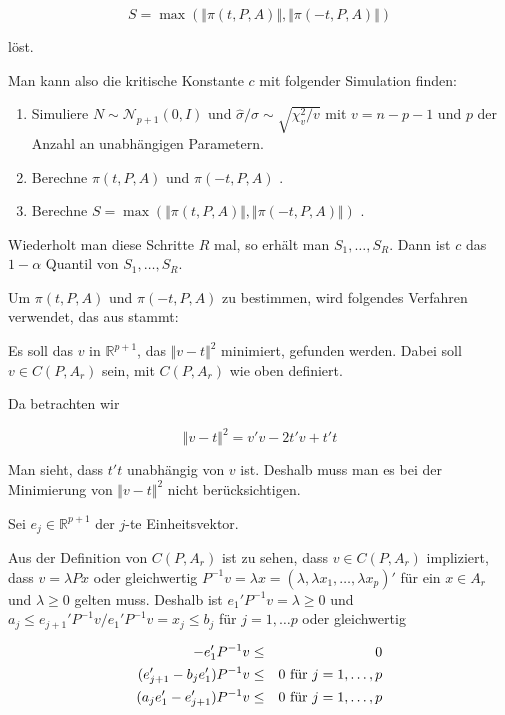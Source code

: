 \documentclass[12pt,a4paper]{article}
\theoremstyle{definition}
\theoremstyle{definition}
\theoremstyle{definition}
\theoremstyle{definition}
\begin{document}
\begin{equation*}
S=\max(\Vert \pi(t,P,A) \Vert, \Vert \pi(-t,P,A) \Vert)
\end{equation*}
 
löst. 

Man kann also die kritische Konstante $c$ mit folgender Simulation finden:

\begin{enumerate}
\item Simuliere $N \sim \mathscr{N}_{p+1}(0,I)$ und $\hat{\sigma}/\sigma\sim\sqrt{\chi_v^2/v}$ mit $v=n-p-1$ und $p$ der Anzahl an unabhängigen Parametern.
\item Berechne $\pi(t,P,A)$ und $\pi(-t,P,A)$ .
\item Berechne $S=\max(\Vert \pi(t,P,A) \Vert, \Vert \pi(-t,P,A) \Vert)$ .
\end{enumerate}

Wiederholt man diese Schritte $R$ mal, so erhält man $S_1, \ldots, S_R$. Dann ist $c$ das $1-\alpha$ Quantil von $S_1, \ldots, S_R$.

Um $\pi(t,P,A)$ und $\pi(-t,P,A)$ zu bestimmen, wird folgendes Verfahren verwendet, das aus \cite[Appendix B]{Liu64} stammt:

Es soll das $v$ in $\mathbb{R}^{p+1}$, das $\Vert v-t \Vert^2$ minimiert, gefunden werden. Dabei soll $v \in C(P,A_{r})$ sein, mit $C(P,A_{r})$ wie oben definiert. 

Da betrachten wir

\begin{equation*}
\Vert v-t \Vert^2 = v'v-2t'v+t't 
\end{equation*}

Man sieht, dass $t't$ unabhängig von $v$ ist. Deshalb muss man es bei der Minimierung von $\Vert v-t \Vert^2$ nicht berücksichtigen.
 
Sei $e_j \in \mathbb{R}^{p+1}$ der $j$-te Einheitsvektor. 

Aus der Definition von $C(P,A_{r})$ ist zu sehen, dass $v \in C(P,A_{r})$ impliziert, dass $v=\lambda P x$ oder gleichwertig $P^{-1}v=\lambda x = (\lambda, \lambda x_1, \ldots , \lambda x_p)'$ für ein $x \in A_{r}$ und $\lambda \geq 0$ gelten muss. Deshalb ist $e_1'P^{-1}v = \lambda \geq 0$ und $a_j \leq e_{j+1}'P^{-1}v/e_1'P^{-1}v = x_j \leq b_j$ für $j = 1, \ldots p$ oder gleichwertig

\begin{eqnarray*}
- e_1' P^{-1} v &\leq & 0 \\
(e_{j+1}' - b_j e_1') P^{-1} v &\leq & 0 \textnormal{ für } j = 1, \ldots, p \\
(a_{j} e_1' - e_{j+1}')P^{-1} v &\leq & 0 \textnormal{ für } j = 1, \ldots, p
\end{eqnarray*}
\end{document}
